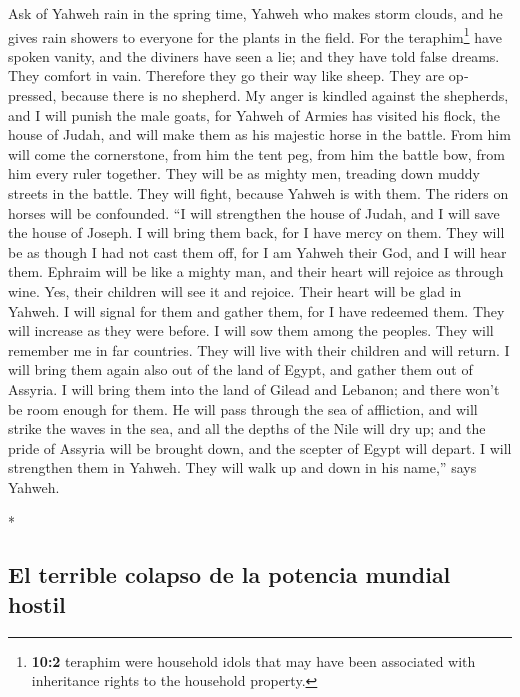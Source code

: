 \begin{paracol}{2}
\begin{otherlanguage}{english}
 Ask of Yahweh rain in the spring time, Yahweh who makes
storm clouds, and he gives rain showers to everyone for the plants in
the field.  For the teraphim\footnote{\textbf{10:2}
  teraphim were household idols that may have been associated with
  inheritance rights to the household property.} have spoken vanity, and
the diviners have seen a lie; and they have told false dreams. They
comfort in vain. Therefore they go their way like sheep. They are
oppressed, because there is no shepherd.  My anger is
kindled against the shepherds, and I will punish the male goats, for
Yahweh of Armies has visited his flock, the house of Judah, and will
make them as his majestic horse in the battle.  From him
will come the cornerstone, from him the tent peg, from him the battle
bow, from him every ruler together.  They will be as
mighty men, treading down muddy streets in the battle. They will fight,
because Yahweh is with them. The riders on horses will be confounded.
 ``I will strengthen the house of Judah, and I will save
the house of Joseph. I will bring them back, for I have mercy on them.
They will be as though I had not cast them off, for I am Yahweh their
God, and I will hear them.  Ephraim will be like a mighty
man, and their heart will rejoice as through wine. Yes, their children
will see it and rejoice. Their heart will be glad in Yahweh.
 I will signal for them and gather them, for I have
redeemed them. They will increase as they were before.  I
will sow them among the peoples. They will remember me in far countries.
They will live with their children and will return.  I
will bring them again also out of the land of Egypt, and gather them out
of Assyria. I will bring them into the land of Gilead and Lebanon; and
there won't be room enough for them.  He will pass
through the sea of affliction, and will strike the waves in the sea, and
all the depths of the Nile will dry up; and the pride of Assyria will be
brought down, and the scepter of Egypt will depart.  I
will strengthen them in Yahweh. They will walk up and down in his
name,'' says Yahweh.

\end{otherlanguage}

\switchcolumn[0]*

\hypertarget{el-terrible-colapso-de-la-potencia-mundial-hostil}{%
\subsection{El terrible colapso de la potencia mundial
hostil}\label{el-terrible-colapso-de-la-potencia-mundial-hostil}}


\end{paracol}
